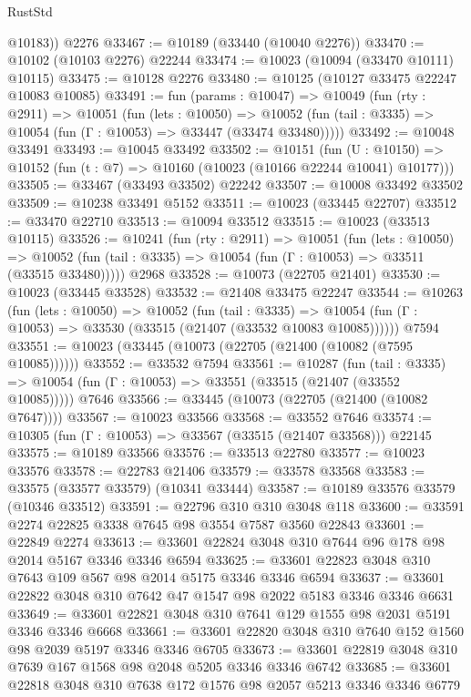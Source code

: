 \begin{lexlean}{RustStd}
\begin{coremodule}
        @10183))
    @2276
@33467 := @10189 (@33440 (@10040 @2276))
@33470 := @10102 (@10103 @2276) @22244
@33474 := @10023 (@10094 (@33470 @10111) @10115)
@33475 := @10128 @2276
@33480 := @10125 (@10127 @33475 @22247 @10083 @10085)
@33491 := fun (params : @10047) =>
  @10049
    (fun (rty : @2911) =>
    @10051
      (fun (lets : @10050) =>
      @10052 (fun (tail : @3335) => @10054 (fun (Γ : @10053) => @33447 (@33474 @33480)))))
@33492 := @10048 @33491
@33493 := @10045 @33492
@33502 := @10151
    (fun (U : @10150) => @10152 (fun (t : @7) => @10160 (@10023 (@10166 @22244 @10041) @10177)))
@33505 := @33467 (@33493 @33502) @22242
@33507 := @10008 @33492 @33502
@33509 := @10238 @33491 @5152
@33511 := @10023 (@33445 @22707)
@33512 := @33470 @22710
@33513 := @10094 @33512
@33515 := @10023 (@33513 @10115)
@33526 := @10241
    (fun (rty : @2911) =>
    @10051
      (fun (lets : @10050) =>
      @10052 (fun (tail : @3335) => @10054 (fun (Γ : @10053) => @33511 (@33515 @33480)))))
    @2968
@33528 := @10073 (@22705 @21401)
@33530 := @10023 (@33445 @33528)
@33532 := @21408 @33475 @22247
@33544 := @10263
    (fun (lets : @10050) =>
    @10052
      (fun (tail : @3335) =>
      @10054 (fun (Γ : @10053) => @33530 (@33515 (@21407 (@33532 @10083 @10085))))))
    @7594
@33551 := @10023 (@33445 (@10073 (@22705 (@21400 (@10082 (@7595 @10085))))))
@33552 := @33532 @7594
@33561 := @10287
    (fun (tail : @3335) => @10054 (fun (Γ : @10053) => @33551 (@33515 (@21407 (@33552 @10085)))))
    @7646
@33566 := @33445 (@10073 (@22705 (@21400 (@10082 @7647))))
@33567 := @10023 @33566
@33568 := @33552 @7646
@33574 := @10305 (fun (Γ : @10053) => @33567 (@33515 (@21407 @33568))) @22145
@33575 := @10189 @33566
@33576 := @33513 @22780
@33577 := @10023 @33576
@33578 := @22783 @21406
@33579 := @33578 @33568
@33583 := @33575 (@33577 @33579) (@10341 @33444)
@33587 := @10189 @33576 @33579 (@10346 @33512)
@33591 := @22796 @310 @310 @3048 @118
@33600 := @33591 @2274 @22825 @3338 @7645 @98 @3554 @7587 @3560 @22843
@33601 := @22849 @2274
@33613 := @33601 @22824 @3048 @310 @7644 @96 @178 @98 @2014 @5167 @3346 @3346 @6594
@33625 := @33601 @22823 @3048 @310 @7643 @109 @567 @98 @2014 @5175 @3346 @3346 @6594
@33637 := @33601 @22822 @3048 @310 @7642 @47 @1547 @98 @2022 @5183 @3346 @3346 @6631
@33649 := @33601 @22821 @3048 @310 @7641 @129 @1555 @98 @2031 @5191 @3346 @3346 @6668
@33661 := @33601 @22820 @3048 @310 @7640 @152 @1560 @98 @2039 @5197 @3346 @3346 @6705
@33673 := @33601 @22819 @3048 @310 @7639 @167 @1568 @98 @2048 @5205 @3346 @3346 @6742
@33685 := @33601 @22818 @3048 @310 @7638 @172 @1576 @98 @2057 @5213 @3346 @3346 @6779

\end{coremodule}
\end{lexlean}
